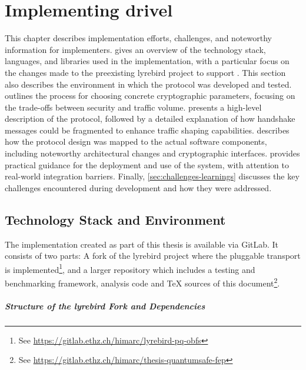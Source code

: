 \chapter{Implementing drivel}\label{ch:implementation}

This chapter describes implementation efforts, challenges, and noteworthy information for implementers.
 gives an overview of the technology stack, languages, and libraries used in the implementation, with a particular focus on the changes made to the preexisting lyrebird project \cite{lyrebird} to support \drivel{}. This section also describes the environment in which the protocol was developed and tested.
 outlines the process for choosing concrete cryptographic parameters, focusing on the trade-offs between security and traffic volume.
 presents a high-level description of the \drivel{} protocol, followed by a detailed explanation of how handshake messages could be fragmented to enhance traffic shaping capabilities.
 describes how the protocol design was mapped to the actual software components, including noteworthy architectural changes and cryptographic interfaces.
 provides practical guidance for the deployment and use of the system, with attention to real-world integration barriers.
Finally, \cref{sec:challenges-learnings} discusses the key challenges encountered during development and how they were addressed.

\section{Technology Stack and Environment} \label{sec:tech-stack}

The implementation created as part of this thesis is available via GitLab. It consists of two parts: A fork of the lyrebird project \cite{lyrebird} where the \drivel{} pluggable transport is implemented\footnote{See \url{https://gitlab.ethz.ch/himarc/lyrebird-pq-obfs}}, and a larger repository which includes a testing and benchmarking framework, analysis code and TeX sources of this document\footnote{See \url{https://gitlab.ethz.ch/himarc/thesis-quantumsafe-fep}}.

\paragraph{Structure of the lyrebird Fork and Dependencies}

